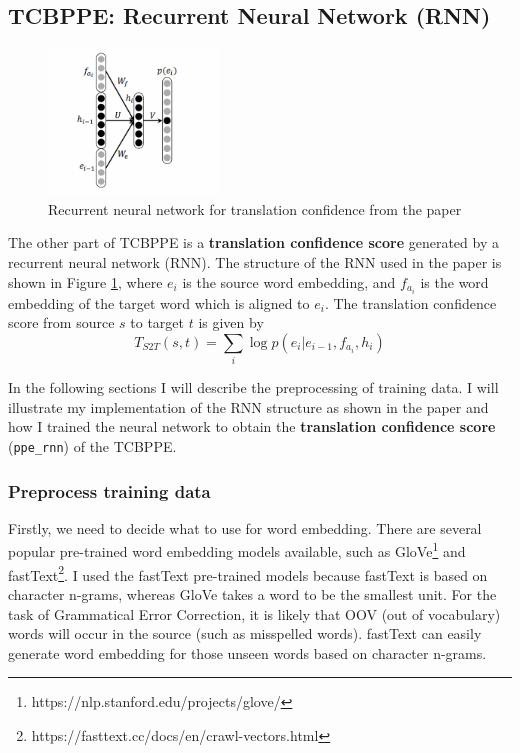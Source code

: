 \documentclass[12pt,a4paper,twoside,openright]{report}
\begin{document}
\subsection{TCBPPE: Recurrent Neural Network (RNN)} \label{section:TCBPPE_rnn}

\begin{figure}[ht]
\centering
\includegraphics[width=0.4\textwidth]{images/rnn_ppe.png}
\caption{Recurrent neural network for translation confidence from the paper\cite{r2nn}}
\label{fig:rnn_ppe}
\end{figure}

The other part of TCBPPE is a \textbf{translation confidence score} generated by a recurrent neural network (RNN). The structure of the RNN used in the paper\cite{r2nn} is shown in Figure \ref{fig:rnn_ppe}, where $e_i$ is the source word embedding, and $f_{a_i}$ is the word embedding of the target word which is aligned to $e_i$. The translation confidence score from source $s$ to target $t$ is given by
\[ T_{S2T}(s, t) = \sum_{i} \log p(e_i|e_{i-1}, f_{a_i}, h_i)\]

In the following sections I will describe the preprocessing of training data. I will illustrate my implementation of the RNN structure as shown in the paper\cite{r2nn} and how I trained the neural network to obtain the \textbf{translation confidence score} (\texttt{ppe\_rnn}) of the TCBPPE.

\subsubsection{Preprocess training data}
Firstly, we need to decide what to use for word embedding. There are several popular pre-trained word embedding models available, such as GloVe\footnote{https://nlp.stanford.edu/projects/glove/} and fastText\footnote{https://fasttext.cc/docs/en/crawl-vectors.html}. I used the fastText pre-trained models because fastText is based on character n-grams, whereas GloVe takes a word to be the smallest unit. For the task of Grammatical Error Correction, it is likely that OOV (out of vocabulary) words will occur in the source (such as misspelled words). fastText can easily generate word embedding for those unseen words based on character n-grams.
\end{document}
